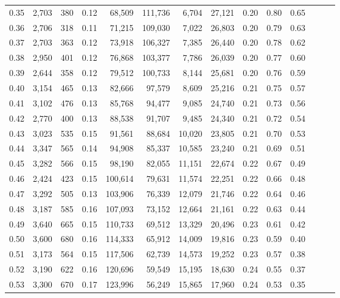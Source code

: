 \begin{tabular}{rrrrrrrrrrrrrr}
0.35 &  2,703 &  380 &  0.12 &   68,509 &  111,736 &   6,704 &  27,121 &  0.20 &  0.80 &      0.65 \\
0.36 &  2,706 &  318 &  0.11 &   71,215 &  109,030 &   7,022 &  26,803 &  0.20 &  0.79 &      0.63 \\
0.37 &  2,703 &  363 &  0.12 &   73,918 &  106,327 &   7,385 &  26,440 &  0.20 &  0.78 &      0.62 \\
0.38 &  2,950 &  401 &  0.12 &   76,868 &  103,377 &   7,786 &  26,039 &  0.20 &  0.77 &      0.60 \\
0.39 &  2,644 &  358 &  0.12 &   79,512 &  100,733 &   8,144 &  25,681 &  0.20 &  0.76 &      0.59 \\
0.40 &  3,154 &  465 &  0.13 &   82,666 &   97,579 &   8,609 &  25,216 &  0.21 &  0.75 &      0.57 \\
0.41 &  3,102 &  476 &  0.13 &   85,768 &   94,477 &   9,085 &  24,740 &  0.21 &  0.73 &      0.56 \\
0.42 &  2,770 &  400 &  0.13 &   88,538 &   91,707 &   9,485 &  24,340 &  0.21 &  0.72 &      0.54 \\
0.43 &  3,023 &  535 &  0.15 &   91,561 &   88,684 &  10,020 &  23,805 &  0.21 &  0.70 &      0.53 \\
0.44 &  3,347 &  565 &  0.14 &   94,908 &   85,337 &  10,585 &  23,240 &  0.21 &  0.69 &      0.51 \\
0.45 &  3,282 &  566 &  0.15 &   98,190 &   82,055 &  11,151 &  22,674 &  0.22 &  0.67 &      0.49 \\
0.46 &  2,424 &  423 &  0.15 &  100,614 &   79,631 &  11,574 &  22,251 &  0.22 &  0.66 &      0.48 \\
0.47 &  3,292 &  505 &  0.13 &  103,906 &   76,339 &  12,079 &  21,746 &  0.22 &  0.64 &      0.46 \\
0.48 &  3,187 &  585 &  0.16 &  107,093 &   73,152 &  12,664 &  21,161 &  0.22 &  0.63 &      0.44 \\
0.49 &  3,640 &  665 &  0.15 &  110,733 &   69,512 &  13,329 &  20,496 &  0.23 &  0.61 &      0.42 \\
0.50 &  3,600 &  680 &  0.16 &  114,333 &   65,912 &  14,009 &  19,816 &  0.23 &  0.59 &      0.40 \\
0.51 &  3,173 &  564 &  0.15 &  117,506 &   62,739 &  14,573 &  19,252 &  0.23 &  0.57 &      0.38 \\
0.52 &  3,190 &  622 &  0.16 &  120,696 &   59,549 &  15,195 &  18,630 &  0.24 &  0.55 &      0.37 \\
0.53 &  3,300 &  670 &  0.17 &  123,996 &   56,249 &  15,865 &  17,960 &  0.24 &  0.53 &      0.35 \\

\end{tabular}
